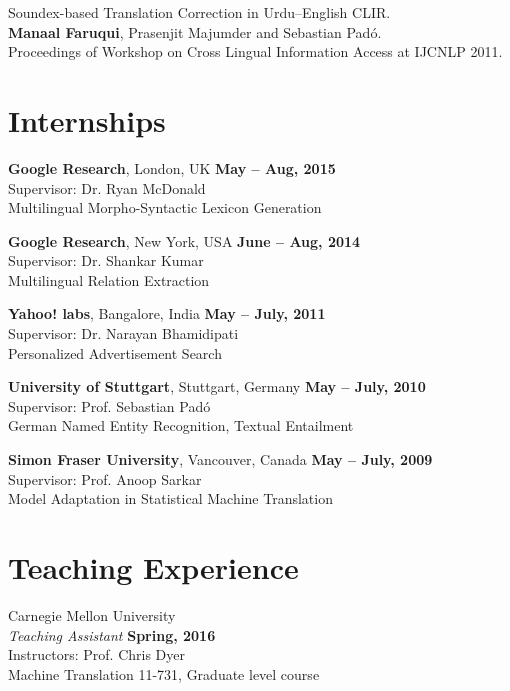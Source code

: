 \documentclass[margin,line]{res}
\begin{document}
\begin{resume}
Soundex-based Translation Correction in Urdu--English CLIR.\\
\textbf{Manaal Faruqui}, Prasenjit Majumder and Sebastian Pad\'{o}.\\
Proceedings of Workshop on Cross Lingual Information Access at IJCNLP 2011.

\section{\sc Internships}

{\bf Google Research}, London, UK \hfill {\bf May -- Aug, 2015}\\
Supervisor: Dr. Ryan McDonald \\
Multilingual Morpho-Syntactic Lexicon Generation

{\bf Google Research}, New York, USA \hfill {\bf June -- Aug, 2014}\\
Supervisor: Dr. Shankar Kumar \\
Multilingual Relation Extraction

{\bf Yahoo! labs}, Bangalore, India \hfill {\bf May -- July, 2011}\\
Supervisor: Dr. Narayan Bhamidipati\\
Personalized Advertisement Search

{\bf University of Stuttgart}, Stuttgart, Germany \hfill {\bf May -- July, 2010}\\
Supervisor: Prof. Sebastian Pad\'{o} \\
German Named Entity Recognition, Textual Entailment

{\bf Simon Fraser University}, Vancouver, Canada \hfill {\bf May -- July, 2009}\\
Supervisor: Prof. Anoop Sarkar\\
Model Adaptation in Statistical Machine Translation

\section{\sc Teaching Experience}

{Carnegie Mellon University} \\
{\em Teaching Assistant} \hfill {\bf Spring, 2016}\\
Instructors: Prof. Chris Dyer\\
Machine Translation 11-731, Graduate level course


\end{resume}
\end{document}

